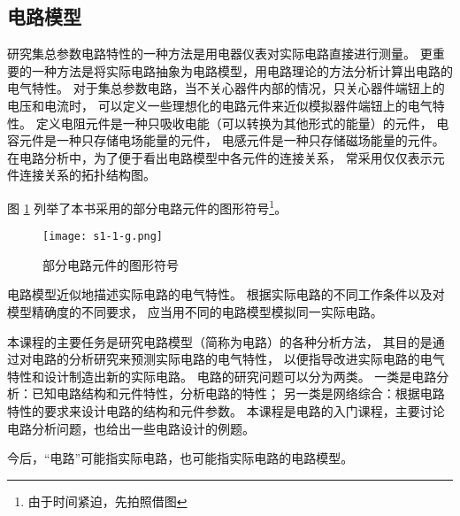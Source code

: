 \subsection{电路模型}
研究集总参数电路特性的一种方法是用电器仪表对实际电路直接进行测量。
更重要的一种方法是将实际电路抽象为电路模型，用电路理论的方法分析计算出电路的电气特性。
对于集总参数电路，当不关心器件内部的情况，只关心器件端钮上的电压和电流时，
可以定义一些理想化的电路元件来近似模拟器件端钮上的电气特性。
定义电阻元件是一种只吸收电能（可以转换为其他形式的能量）的元件，
电容元件是一种只存储电场能量的元件，
电感元件是一种只存储磁场能量的元件。
在电路分析中，为了便于看出电路模型中各元件的连接关系，
常采用仅仅表示元件连接关系的拓扑结构图。

图 \ref{fig:fig1_1_1} 列举了本书采用的部分电路元件的图形符号\footnote{由于时间紧迫，先拍照借图}。

\begin{figure}[htbp]
\centering
\texttt{[image: s1-1-g.png]}
\caption{部分电路元件的图形符号}\label{fig:fig1_1_1}
\end{figure}

电路模型近似地描述实际电路的电气特性。
根据实际电路的不同工作条件以及对模型精确度的不同要求，
应当用不同的电路模型模拟同一实际电路。

本课程的主要任务是研究电路模型（简称为电路）的各种分析方法，
其目的是通过对电路的分析研究来预测实际电路的电气特性，
以便指导改进实际电路的电气特性和设计制造出新的实际电路。
电路的研究问题可以分为两类。
一类是电路分析：已知电路结构和元件特性，分析电路的特性；
另一类是网络综合：根据电路特性的要求来设计电路的结构和元件参数。
本课程是电路的入门课程，主要讨论电路分析问题，也给出一些电路设计的例题。

今后，“电路”可能指实际电路，也可能指实际电路的电路模型。
